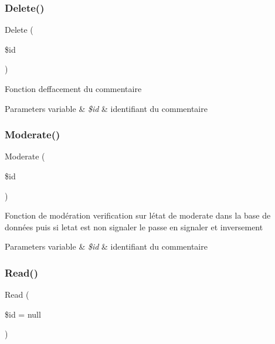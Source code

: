 \subsubsection{\texorpdfstring{Delete()}{Delete()}}
{\footnotesize\ttfamily Delete (\begin{DoxyParamCaption}\item[{}]{\$id }\end{DoxyParamCaption})}

Fonction d\textquotesingle{}effacement du commentaire 
\begin{DoxyParams}[1]{Parameters}
variable & {\em \$id} & identifiant du commentaire \\
\hline
\end{DoxyParams}
\mbox{\label{class_src_1_1_managers_1_1comment_manager_a511df177d885f133ac59c2b68c7046f2}} 
\subsubsection{\texorpdfstring{Moderate()}{Moderate()}}
{\footnotesize\ttfamily Moderate (\begin{DoxyParamCaption}\item[{}]{\$id }\end{DoxyParamCaption})}

Fonction de modération verification sur létat de \textquotesingle{}moderate\textquotesingle{} dans la base de données puis si l\textquotesingle{}etat est non signaler le passe en signaler et inversement 
\begin{DoxyParams}[1]{Parameters}
variable & {\em \$id} & identifiant du commentaire \\
\hline
\end{DoxyParams}
\mbox{\label{class_src_1_1_managers_1_1comment_manager_af0b2d518844625de0b1fe21ebb8e6c58}} 
\subsubsection{\texorpdfstring{Read()}{Read()}}
{\footnotesize\ttfamily Read (\begin{DoxyParamCaption}\item[{}]{\$id = {\ttfamily null} }\end{DoxyParamCaption})}


